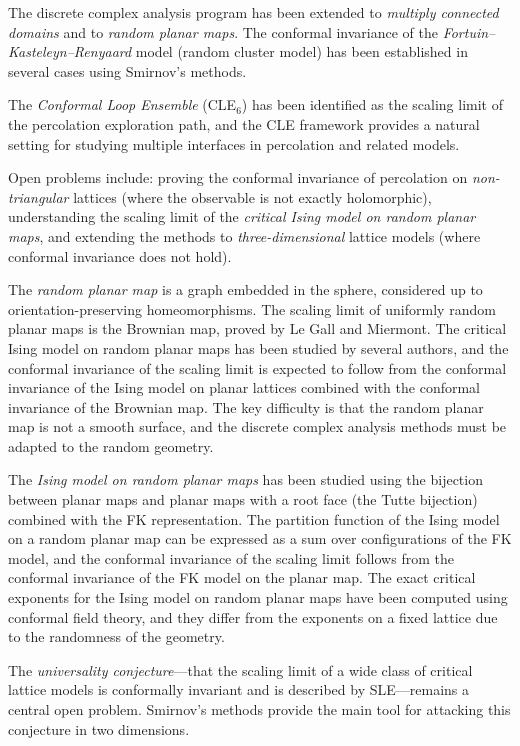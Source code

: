 The discrete complex analysis program has been extended to \emph{multiply connected domains} and to \emph{random planar maps}. The conformal invariance of the \emph{Fortuin--Kasteleyn--Renyaard} model (random cluster model) has been established in several cases using Smirnov's methods.

The \emph{Conformal Loop Ensemble} (CLE$_6$) has been identified as the scaling limit of the percolation exploration path, and the CLE framework provides a natural setting for studying multiple interfaces in percolation and related models.

Open problems include: proving the conformal invariance of percolation on \emph{non-triangular} lattices (where the observable is not exactly holomorphic), understanding the scaling limit of the \emph{critical Ising model on random planar maps}, and extending the methods to \emph{three-dimensional} lattice models (where conformal invariance does not hold).

The \emph{random planar map} is a graph embedded in the sphere, considered up to orientation-preserving homeomorphisms. The scaling limit of uniformly random planar maps is the Brownian map, proved by Le Gall and Miermont. The critical Ising model on random planar maps has been studied by several authors, and the conformal invariance of the scaling limit is expected to follow from the conformal invariance of the Ising model on planar lattices combined with the conformal invariance of the Brownian map. The key difficulty is that the random planar map is not a smooth surface, and the discrete complex analysis methods must be adapted to the random geometry.

The \emph{Ising model on random planar maps} has been studied using the bijection between planar maps and planar maps with a root face (the Tutte bijection) combined with the FK representation. The partition function of the Ising model on a random planar map can be expressed as a sum over configurations of the FK model, and the conformal invariance of the scaling limit follows from the conformal invariance of the FK model on the planar map. The exact critical exponents for the Ising model on random planar maps have been computed using conformal field theory, and they differ from the exponents on a fixed lattice due to the randomness of the geometry.

The \emph{universality conjecture}---that the scaling limit of a wide class of critical lattice models is conformally invariant and is described by SLE---remains a central open problem. Smirnov's methods provide the main tool for attacking this conjecture in two dimensions.

